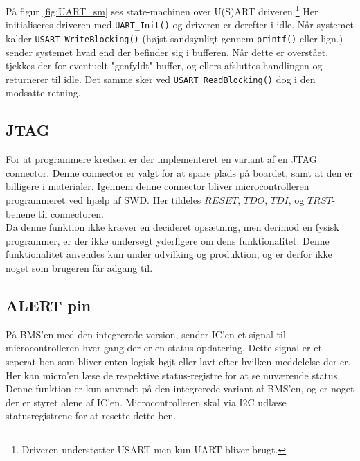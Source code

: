 På figur \ref{fig:UART_sm} ses state-machinen over U(S)ART driveren.\footnote{Driveren understøtter USART men kun UART bliver brugt.} Her initialiseres driveren med \verb|UART_Init()| og driveren er derefter i idle. Når systemet kalder \verb|USART_WriteBlocking()| (højst sandsynligt gennem \verb|printf()| eller lign.) sender systemet hvad end der befinder sig i bufferen. Når dette er overstået, tjekkes der for eventuelt "genfyldt" buffer, og ellers afsluttes handlingen og returnerer til idle. Det samme sker ved \verb|USART_ReadBlocking()| dog i den modsatte retning. 

\subsection{JTAG}
For at programmere kredsen er der implementeret en variant af en JTAG connector. Denne connector er valgt for at spare plads på boardet, samt at den er billigere i materialer. Igennem denne connector bliver microcontrolleren programmeret ved hjælp af SWD. Her tildeles $\overline{RESET}$, $TDO$, $TDI$, og $TRST$-benene til connectoren. \\

Da denne funktion ikke kræver en decideret opsætning, men derimod en fysisk programmer, er der ikke undersøgt yderligere om dens funktionalitet. Denne funktionalitet anvendes kun under udvilking og produktion, og er derfor ikke noget som brugeren får adgang til. 

\subsection{ALERT pin}
På BMS'en med den integrerede version, sender IC'en et signal til microcontrolleren hver gang der er en status opdatering. Dette signal er et seperat ben som bliver enten logisk højt eller lavt efter hvilken meddelelse der er. Her kan micro'en læse de respektive status-registre for at se nuværende status. Denne funktion er kun anvendt på den integrerede variant af BMS'en, og er noget der er styret alene af IC'en. Microcontrolleren skal via I2C udlæse statusregistrene for at resette dette ben. 
